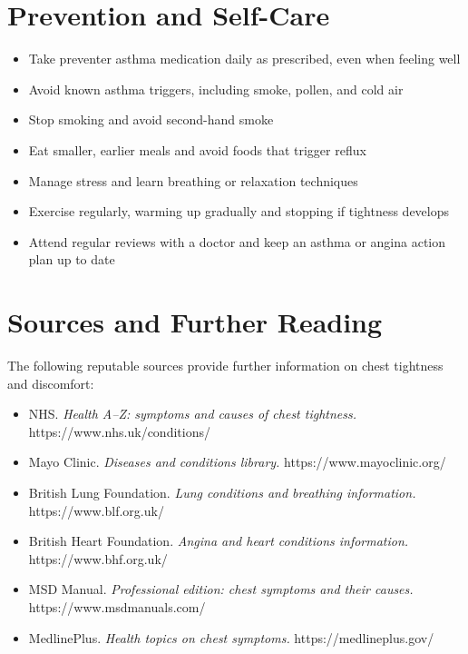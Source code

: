 \section*{Prevention and Self-Care}
\begin{itemize}
    \item Take preventer asthma medication daily as prescribed, even when feeling well
    \item Avoid known asthma triggers, including smoke, pollen, and cold air
    \item Stop smoking and avoid second-hand smoke
    \item Eat smaller, earlier meals and avoid foods that trigger reflux
    \item Manage stress and learn breathing or relaxation techniques
    \item Exercise regularly, warming up gradually and stopping if tightness develops
    \item Attend regular reviews with a doctor and keep an asthma or angina action plan up to date
\end{itemize}

\section*{Sources and Further Reading}
The following reputable sources provide further information on chest tightness and discomfort:
\begin{itemize}
    \item NHS. \textit{Health A--Z: symptoms and causes of chest tightness.} https://www.nhs.uk/conditions/
    \item Mayo Clinic. \textit{Diseases and conditions library.} https://www.mayoclinic.org/
    \item British Lung Foundation. \textit{Lung conditions and breathing information.} https://www.blf.org.uk/
    \item British Heart Foundation. \textit{Angina and heart conditions information.} https://www.bhf.org.uk/
    \item MSD Manual. \textit{Professional edition: chest symptoms and their causes.} https://www.msdmanuals.com/
    \item MedlinePlus. \textit{Health topics on chest symptoms.} https://medlineplus.gov/
\end{itemize}
